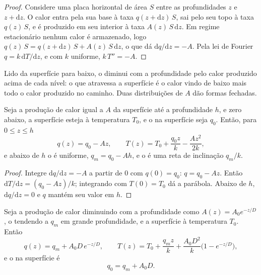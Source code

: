 \begin{proof}
Considere uma placa horizontal de área $S$ entre as profundidades $z$ e $z +
\mathrm dz$. O calor entra pela sua base à taxa $q(z + \mathrm dz)\,S$,
sai pelo seu topo à taxa $q(z)\,S$, e é produzido em seu interior à
taxa $A(z)\,S\,\mathrm dz$. Em regime estacionário nenhum calor é armazenado, logo
$q(z)\,S = q(z + \mathrm dz)\,S + A(z)\,S\,\mathrm dz$, o que dá
$\mathrm dq/\mathrm dz = -A$. Pela lei de Fourier $q = k\,\mathrm dT/\mathrm dz$,
e com $k$ uniforme, $k\,T'' = -A$.
\end{proof}

Lido da superfície para baixo, o  diminui com a profundidade pelo calor
produzido acima de cada nível: o que atravessa a superfície é o calor vindo de
baixo mais todo o calor produzido no caminho. Duas distribuições de $A$ dão
formas fechadas.

\begin{proposition}\label{prop:b1:heat-budget:uniform}
Seja a produção de calor igual a $A$ da superfície até a profundidade $h$, e zero
abaixo, a superfície esteja à temperatura $T_0$, e o  na superfície seja $q_0$.
Então, para $0 \le z \le h$
\[
  q(z) = q_0 - A z, \qquad T(z) = T_0 + \frac{q_0 z}{k} - \frac{A z^2}{2k},
\]
e abaixo de $h$ o  é uniforme, $q_m = q_0 - A h$, e o  é uma
reta de inclinação $q_m/k$.
\end{proposition}

\begin{proof}
Integre $\mathrm dq/\mathrm dz = -A$ a partir de $0$ com $q(0) = q_0$: $q = q_0 -
Az$. Então $\mathrm dT/\mathrm dz = (q_0 - Az)/k$; integrando com $T(0) = T_0$
dá a parábola. Abaixo de $h$, $\mathrm dq/\mathrm dz = 0$ e $q$ mantém seu
valor em $h$.
\end{proof}

\begin{theorem}
\label{thm:b1:heat-budget:exponential}
Seja a produção de calor diminuindo com a profundidade como $A(z) = A_0 e^{-z/D}$, o  tendendo a $q_m$ em grande profundidade, e a superfície à temperatura $T_0$. Então
\[
  q(z) = q_m + A_0 D\,e^{-z/D}, \qquad
  T(z) = T_0 + \frac{q_m z}{k} + \frac{A_0 D^2}{k}\bigl(1 - e^{-z/D}\bigr),
\]
e o  na superfície é
\[
  q_0 = q_m + A_0 D .
\]
\end{theorem}


